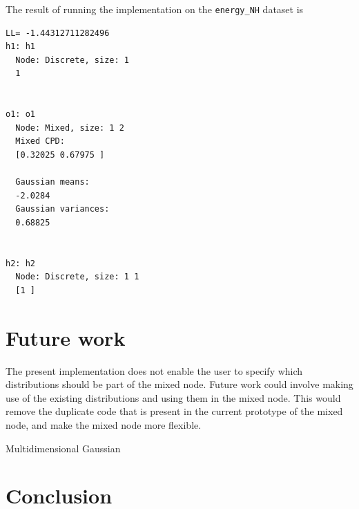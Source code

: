 \documentclass[10pt, journal, compsocconf,a4paper]{IEEEtran}
\begin{document}
The result of running the implementation on the \texttt{energy\_NH} dataset is

\begin{verbatim}
LL= -1.44312711282496
h1: h1
  Node: Discrete, size: 1 
  1 


o1: o1
  Node: Mixed, size: 1 2 
  Mixed CPD: 
  [0.32025 0.67975 ]

  Gaussian means: 
  -2.0284 
  Gaussian variances: 
  0.68825 


h2: h2
  Node: Discrete, size: 1 1 
  [1 ]  
\end{verbatim}



\section{Future work} %
\label{sec:future_work}
The present implementation does not enable the user to specify which distributions should be part of the mixed node. Future work could involve making use of the existing distributions and using them in the mixed node. This would remove the duplicate code that is present in the current prototype of the mixed node, and make the mixed node more flexible.

Multidimensional Gaussian


\section{Conclusion} %
\label{sec:conclusion}





\end{document}
